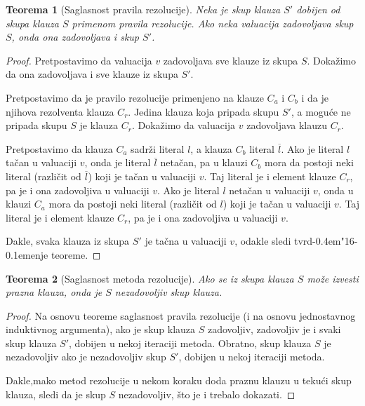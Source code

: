 \documentclass[12pt, a4paper, titlepage, twoside]{article}
\newtheorem{theorem}{Teorema}[section]
\theoremstyle{definition}
\def\dj{d\kern-0.4em\char"16\kern-0.1em}
\begin{document}
\vspace{0.2cm}
\begin{theorem}[Saglasnost pravila rezolucije]
Neka je skup klauza $S'$ dobijen od skupa klauza $S$ primenom pravila rezolucije. 
Ako neka valuacija zadovoljava skup $S$, onda ona zadovoljava i skup $S'$.
\end{theorem}

\vspace{0.2cm}
\begin{proof}
Pretpostavimo da valuacija $v$ zadovoljava sve klauze iz skupa $S$. Doka\v zimo da ona 
zadovoljava i sve klauze iz skupa $S'$. 

\noindent
Pretpostavimo da je
pravilo rezolucije primenjeno na klauze $C_a$ i $C_b$ i da je njihova rezolventa
klauza $C_r$. Jedina klauza koja pripada skupu $S'$, a mogu\'ce ne pripada
skupu $S$ je klauza $C_r$. Doka\v zimo da valuacija $v$ zadovoljava klauzu $C_r$.

\noindent
Pretpostavimo da klauza $C_a$ sadr\v zi literal $l$, a klauza $C_b$ literal $\overline{l}$. Ako je
literal $l$ ta\v can u valuaciji $v$, onda je literal $\overline{l}$ neta\v can, pa u 
klauzi $C_b$ mora
da postoji neki literal (razli\v cit od $\overline{l}$) koji je ta\v can u valuaciji $v$. Taj literal
je i element klauze $C_r$, pa je i ona zadovoljiva u valuaciji $v$. Ako je literal
$l$ neta\v can u valuaciji $v$, onda u klauzi $C_a$ mora da postoji neki literal 
(razli\v cit od $l$) koji je ta\v can u valuaciji $v$. Taj literal je i element klauze $C_r$, 
pa je i ona zadovoljiva u valuaciji $v$. 

\noindent
Dakle, svaka klauza iz skupa $S'$ je ta\v cna
u valuaciji $v$, odakle sledi tvr\dj{}enje teoreme.
\end{proof}

\vspace{0.2cm}
\begin{theorem}[Saglasnost metoda rezolucije]
Ako se iz skupa klauza $S$ mo\v ze izvesti prazna klauza, onda je $S$ nezadovoljiv skup klauza.
\end{theorem}

\vspace{0.2cm}
\begin{proof}
Na osnovu teoreme saglasnost pravila rezolucije (i na osnovu jednostavnog induktivnog argumenta),
ako je skup klauza $S$ zadovoljiv, zadovoljiv je i svaki skup klauza
$S'$, dobijen u nekoj iteraciji metoda. Obratno, skup klauza $S$ je nezadovoljiv
ako je nezadovoljiv skup $S'$, dobijen u nekoj iteraciji metoda. 

\noindent
Dakle,mako metod rezolucije u nekom koraku doda praznu klauzu u teku\'ci skup
klauza, sledi da je skup $S$ nezadovoljiv, \v sto je i trebalo dokazati.
\end{proof}
\vspace{0.2cm}
\end{document}
